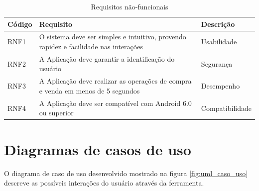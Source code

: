 \begin{table}[htbp]
	\scriptsize
	\centering
	\begin{tabular}{|l|l|l|}
		\hline \textbf{Código} & \textbf{Requisito} & \textbf{Descrição} \\ 
		\hline RNF1 & O sistema deve ser simples e intuitivo, provendo rapidez e facilidade nas interações & Usabilidade \\
		\hline RNF2 & A Aplicação deve garantir a identificação do usuário & Segurança \\
		\hline RNF3 & A Aplicação deve realizar as operações de compra e venda em menos de 5 segundos & Desempenho \\
		\hline RNF4 & A Aplicação deve ser compatível com Android 6.0 ou superior & Compatibilidade \\
		\hline 
	\end{tabular}
	\caption{Requisitos não-funcionais}
	\label{tab:requisitos_funcionais_admin}
\end{table}

\section{Diagramas de casos de uso} \label{sec:modelagem:casos}

O diagrama de caso de uso desenvolvido mostrado na figura \ref{fig:uml_caso_uso} descreve as possíveis interações do usuário através da ferramenta.

